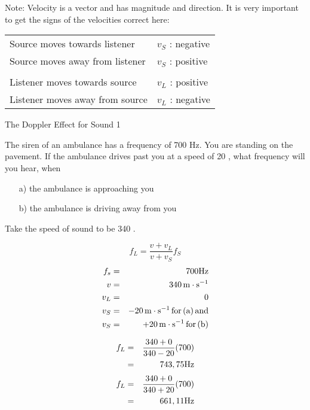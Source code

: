Note: Velocity is a vector and has magnitude and direction. It is very important to get the signs of the velocities correct here:

\begin{center}
\begin{tabular}{|ll|}
\hline
Source moves towards listener & $v_S$ : negative\\
Source moves away from listener & $v_S$ : positive\\
    &   \\
Listener moves towards source & $v_L$ : positive\\
Listener moves away from source & $v_L$ : negative\\
\hline
\end{tabular}
\end{center}
\begin{wex}{The Doppler Effect for Sound 1}{
The siren of an ambulance has a frequency of 700 Hz. You are standing on the pavement. If the ambulance drives past you at a speed of 20 \ms, what frequency will you hear, when
\begin{enumerate}
\item[a)] the ambulance is approaching you 
\item[b)] the ambulance is driving away from you
\end{enumerate}
Take the speed of sound to be 340 \ms.
}
{
$$f_L=\frac{v + v_L}{v + v_S}f_S$$
\begin{eqnarray*}
f_s&=&700 \rm{Hz}\\
v&=&340\,\mathrm{m \cdot s^{-1}}\\
v_L&=&0\\
v_S&=&-20\,\mathrm{m \cdot s^{-1}} \rm{\, for\, (a)\, and}\\
v_S&=&+20\,\mathrm{m \cdot s^{-1}} \rm{\, for\, (b)}
\end{eqnarray*}

\begin{eqnarray*}
f_L&=&\frac{340+0}{340-20}(700)\\
&=&743,75 \rm{Hz}
\end{eqnarray*}
\begin{eqnarray*}
f_L&=&\frac{340+0}{340+20}(700)\\
&=&661,11 \rm{Hz}
\end{eqnarray*}
}
\end{wex}

